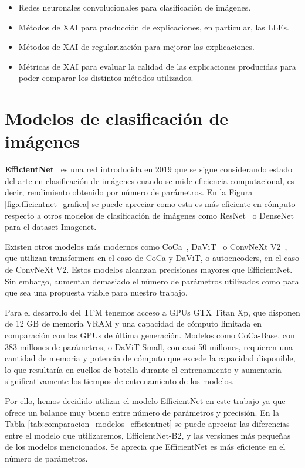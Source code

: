 \begin{itemize}
\item Redes neuronales convolucionales para clasificación de imágenes.
\item Métodos de XAI para producción de explicaciones, en particular, las LLEs.
\item Métodos de XAI de regularización para mejorar las explicaciones.
\item Métricas de XAI para evaluar la calidad de las explicaciones producidas para poder comparar los distintos métodos utilizados.
\end{itemize}

\section{Modelos de clasificación de imágenes}

\textbf{EfficientNet}~\cite{efficientnet2019} es una red introducida en 2019 que se sigue considerando estado del arte en clasificación de imágenes cuando se mide eficiencia computacional, es decir, rendimiento obtenido por número de parámetros. En la Figura \ref{fig:efficientnet_grafica} se puede apreciar como esta es más eficiente en cómputo respecto a otros modelos de clasificación de imágenes como ResNet~\cite{resnet} o DenseNet~\cite{densenet} para el dataset Imagenet. 

Existen otros modelos más modernos como CoCa~\cite{coca}, DaViT~\cite{DaViT} o ConvNeXt V2~\cite{ConvNext}, que utilizan transformers en el caso de CoCa y DaViT, o autoencoders, en el caso de ConvNeXt V2. Estos modelos alcanzan precisiones mayores que EfficientNet. Sin embargo, aumentan demasiado el número de parámetros utilizados como para que sea una propuesta viable para nuestro trabajo.

Para el desarrollo del TFM tenemos acceso a GPUs GTX Titan Xp, que disponen de 12 GB de memoria VRAM y una capacidad de cómputo limitada en comparación con las GPUs de última generación. Modelos como CoCa-Base, con 383 millones de parámetros, o DaViT-Small, con casi 50 millones, requieren una cantidad de memoria y potencia de cómputo que excede la capacidad disponible, lo que resultaría en cuellos de botella durante el entrenamiento y aumentaría significativamente los tiempos de entrenamiento de los modelos.

Por ello, hemos decidido utilizar el modelo EfficientNet en este trabajo ya que ofrece un balance muy bueno entre número de parámetros y precisión. En la Tabla \ref{tab:comparacion_modelos_efficientnet} se puede apreciar las diferencias entre el modelo que utilizaremos, EfficientNet-B2, y las versiones más pequeñas de los modelos mencionados. Se aprecia que EfficientNet es más eficiente en el número de parámetros. 


